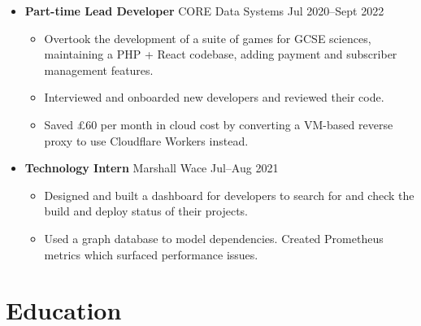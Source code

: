 \begin{itemize}
    \item \textbf{Part-time Lead Developer} \dashdiv{} CORE Data Systems \dashdiv{} Jul 2020--Sept 2022

    \begin{itemize}
      \item Overtook the development of a suite of games for GCSE sciences, maintaining a PHP + React codebase, adding payment and subscriber management features.
      \item Interviewed and onboarded new developers and reviewed their code.
      \item Saved £60 per month in cloud cost by converting a VM-based reverse proxy to use Cloudflare Workers instead.
    \end{itemize}

    \item \textbf{Technology Intern} \dashdiv{} Marshall Wace \dashdiv{} Jul--Aug 2021

    \begin{itemize}
      \item Designed and built a dashboard for developers to search for and check the build and deploy status of their projects.
      \item Used a graph database to model dependencies. Created Prometheus metrics which surfaced performance issues.
    \end{itemize}

  \end{itemize}

  \section{Education}

